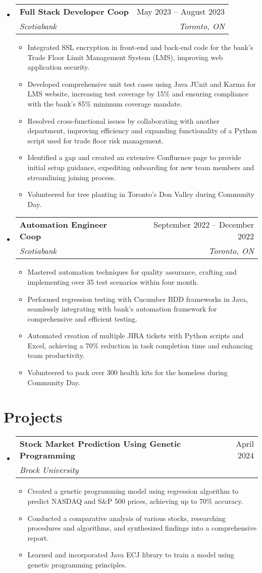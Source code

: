 \documentclass[letterpaper,11pt]{article}
\makeatletter
\newcommand{\resumeItem}[1]{
  \item\small{
    {#1 \vspace{-2pt}}
  }
}
\newcommand{\resumeSubheading}[4]{
  \vspace{-2pt}\item
    \begin{tabular*}{0.97\textwidth}[t]{l@{\extracolsep{\fill}}r}
      \textbf{#1} & #2 \\
      \textit{\small#3} & \textit{\small #4} \\
    \end{tabular*}\vspace{-7pt}
}
\newcommand{\resumeSubHeadingListStart}{\begin{itemize}[leftmargin=0.15in, label={}]}
\newcommand{\resumeSubHeadingListEnd}{\end{itemize}}
\newcommand{\resumeItemListStart}{\begin{itemize}}
\newcommand{\resumeItemListEnd}{\end{itemize}\vspace{-5pt}}
\makeatother
\begin{document}
\begin{center}
\newpage
  \resumeSubHeadingListStart
    \resumeSubheading
    {Full Stack Developer Coop}{May 2023 -- August 2023}
    {Scotiabank}{Toronto, ON}
      \resumeItemListStart
        \resumeItem{Integrated SSL encryption in front-end and back-end code for the bank's Trade Floor Limit Management System (LMS), improving web application security.}
        \resumeItem{Developed comprehensive unit test cases using Java JUnit and Karma for LMS website, increasing test coverage by 15\% and ensuring compliance with the bank’s 85\% minimum coverage mandate.}
      \resumeItem{Resolved cross-functional issues by collaborating with another department, improving efficiency and expanding functionality of a Python script used for trade floor risk management.}
      \resumeItem{Identified a gap and created an extensive Confluence page to provide initial setup guidance, expediting onboarding for new team members and streamlining joining process.}
      \resumeItem{Volunteered for tree planting in Toronto’s Don Valley during Community Day.}
    \resumeItemListEnd
\resumeSubHeadingListEnd

\resumeSubHeadingListStart
  \resumeSubheading
    {Automation Engineer Coop}{September 2022 -- December 2022}
    {Scotiabank}{Toronto, ON}
    \resumeItemListStart
      \resumeItem{Mastered automation techniques for quality assurance, crafting and implementing over 35 test scenarios within four month.}
      \resumeItem{Performed regression testing with Cucumber BDD frameworks in Java, seamlessly integrating with bank’s automation framework for comprehensive and efficient testing.}
      \resumeItem{Automated creation of multiple JIRA tickets with Python scripts and Excel, achieving a 70\% reduction in task completion time and enhancing team productivity.}
      \resumeItem{Volunteered to pack over 300 health kits for the homeless during Community Day.}
    \resumeItemListEnd
\resumeSubHeadingListEnd

\section{Projects}

\resumeSubHeadingListStart
  \resumeSubheading
    {Stock Market Prediction Using Genetic Programming}{April 2024}
    {Brock University}{}
    \resumeItemListStart
      \resumeItem{Created a genetic programming model using regression algorithm to predict NASDAQ and S\&P 500 prices, achieving up to 70\% accuracy.}
      \resumeItem{Conducted a comparative analysis of various stocks, researching procedures and algorithms, and synthesized findings into a comprehensive report.}
      \resumeItem{Learned and incorporated Java ECJ library to train a model using genetic programming principles.}
    \resumeItemListEnd
\resumeSubHeadingListEnd


\end{center}
\end{document}
